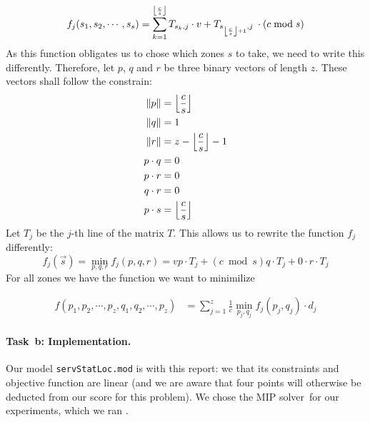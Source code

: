 \begin{equation*}
	f_j(s_1, s_2, \cdots, s_s) = \sum_{k=1}^{\left\lfloor\frac{c}{s}\right\rfloor} T_{s_k, j} \cdot v +  T_{s_{\left\lfloor\frac{c}{s}\right\rfloor + 1}, j} \:\cdot(c \bmod s)
\end{equation*}
As this function obligates us to chose which zones $s$ to take, we need to write this differently. Therefore, let $p$, $q$ and $r$ be three binary vectors of length $z$. These vectors shall follow the constrain: 
\begin{align*}
 \Vert {p} \Vert & = \left\lfloor\frac{c}{s}\right\rfloor \\
 \Vert {q} \Vert & = 1 \\
 \Vert {r} \Vert & = z - \left\lfloor\frac{c}{s}\right\rfloor - 1 \\
 p \cdot q & = 0 \\
 p \cdot r & = 0 \\
 q \cdot r & = 0 \\
 p \cdot s & = \left\lfloor\frac{c}{s}\right\rfloor 
\end{align*}
Let $T_j$ be the $j$-th line of the matrix $T$. This allows us to rewrite the function $f_j$ differently: 
\begin{equation*}
	f_j(\vec s) = \min_{p, q, r} f_j(p, q, r) = v p \cdot T_j + (c \bmod s) q \cdot T_j + 0 \cdot r \cdot T_j
\end{equation*}
For all zones we have the function we want to minimilize

\begin{align*}
	f(p_1, p_2, \cdots, p_z, q_1, q_2, \cdots, p_z) & = \sum_{j=1}^{z} \frac{1}{c} \min_{p_j, q_j}f_j(p_j, q_j) \cdot d_j
\end{align*}


\paragraph{Task~b: Implementation.}
Our model \texttt{servStatLoc.mod} is  with this
report: we  that its constraints and objective function
are linear (and we are aware that four points will otherwise be
deducted from our score for this problem).
%
We chose the MIP solver~\SolverMIP for our experiments, which we ran
.

